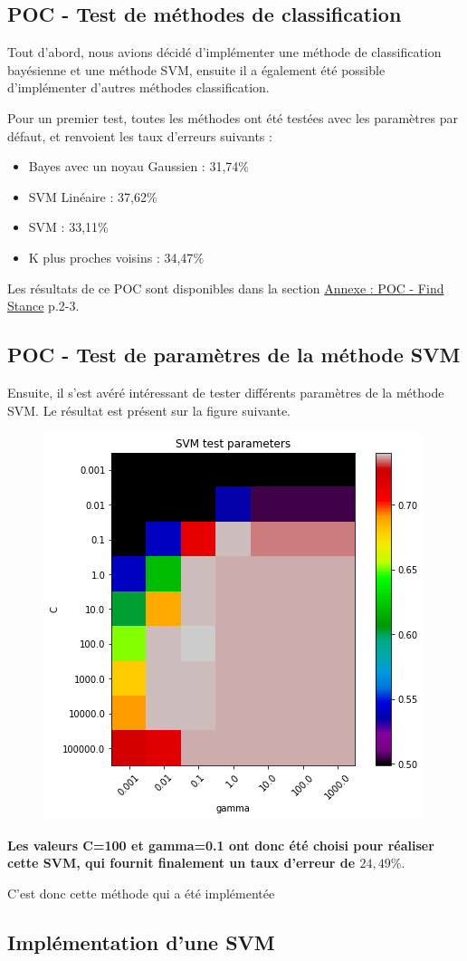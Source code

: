 \subsection{POC - Test de méthodes de classification}

Tout d'abord, nous avions décidé d'implémenter une méthode de classification bayésienne et une méthode SVM, ensuite il a également été possible d'implémenter d'autres méthodes classification.

Pour un premier test, toutes les méthodes ont été testées avec les paramètres par défaut, et renvoient les taux d'erreurs suivants :
\begin{itemize}
\item Bayes avec un noyau Gaussien : 31,74$\%$
\item SVM Linéaire : 37,62$\%$
\item SVM : 33,11$\%$
\item K plus proches voisins : 34,47$\%$
\end{itemize}

Les résultats de ce POC sont disponibles dans la section \hyperref[annexe-stance-detection]{Annexe : POC - Find Stance} p.2-3.

\subsection{POC - Test de paramètres de la méthode SVM}

Ensuite, il s'est avéré intéressant de tester différents paramètres de la méthode SVM. Le résultat est présent sur la figure suivante.

\begin{figure}[!h]
\centering
\includegraphics{src/annexes/POC_FindStance_V2/output_24_0.png}
\end{figure}

\textbf{Les valeurs C=100 et gamma=0.1 ont donc été choisi pour réaliser cette SVM, qui fournit finalement un taux d'erreur de $24,49\%$}.

C'est donc cette méthode qui a été implémentée

\subsection{Implémentation d'une SVM}




